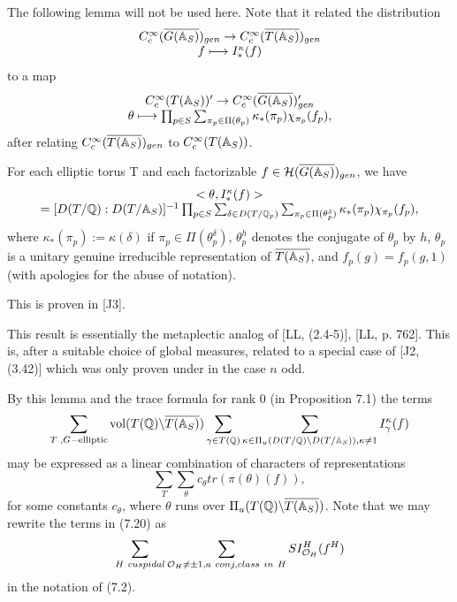 The following lemma will not be used here. Note that it related
the distribution
\[
\begin{array}{c}
C_c^\infty(\overline{G(\mathbb{A} _S)})_{gen}
\rightarrow
C_c^\infty(\overline{T(\mathbb{A} _S)})_{gen}\\
f\longmapsto I_*^\kappa(f)
\end{array}
\]
to a map
\[
\begin{array}{c}
C_c^\infty(T(\mathbb{A} _S))'
\rightarrow
C_c^\infty(\overline{G(\mathbb{A} _S)})'_{gen}\\
\theta \longmapsto
\prod_{p\in S}\sum_{\pi _p\in \Pi (\theta_p)}
\kappa _{*}(\pi _p)\chi _{\pi _p}(f_p),
\end{array}
\]
after relating $C_c^\infty(\overline{T(\mathbb{A} _S)})_{gen}$
to $C_c^\infty(T(\mathbb{A} _S))$.
\begin{lemma}
For each elliptic torus T and each factorizable
$f\in {\cal{H}}(\overline{G(\mathbb{A} _S)})_{gen}$, we have 
\[
\begin{array}{c}
<\theta ,I_{*}^\kappa (f )> \\ 
=[D(T/\mathbb{Q} ):D(T/\mathbb{A} _S)]^{-1}
\prod_{p\in S}
\sum_{\delta\in D(T/{\mathbb Q}_p)}
\sum_{\pi _p\in \Pi (\theta_p^\delta)}
\kappa _{*}(\pi _p)\chi _{\pi _p}(f_p),
\end{array}
\]
where $\kappa _{*}(\pi _p):=\kappa (\delta)$ if
$\pi _p\in \Pi (\theta_p^\delta)$,
${\theta }_p^h$ denotes the conjugate of ${\theta }_p$ by $h$,
${\theta }_p$ is a unitary genuine irreducible
representation of $\overline{T(\mathbb{A} _S)}$, and
$f_p(g)=f_p(g,1)$ (with apologies for the abuse of
notation).
\end{lemma}

This is proven in [J3].
\begin{remark}
This result is essentially the metaplectic analog of
[LL, (2.4-5)], [LL, p. 762]. This is, after a suitable 
choice of global measures, related to a special case of
[J2, (3.42)] which was only proven under in the case $n$ odd.
\end{remark}

By this lemma and the trace formula for rank 0 (in
Proposition 7.1)
the terms 
\begin{equation}
\sum_{ T \; , G-\mathrm{elliptic} }
{\rm vol}(T(\mathbb{Q} )\backslash \overline{T(\mathbb{A} _S)})
\sum_{\gamma \in T(\mathbb{Q} )}
\sum_{ \kappa \in \Pi _u(D(T/{\mathbb Q})\backslash D(T/\mathbb{A} _S)),
 \kappa \neq 1}
I_\gamma ^\kappa (f)
\end{equation}
may be expressed as a linear combination of characters of representations 
\begin{equation}
\sum_T
\sum_\theta c_\theta tr(\pi (\theta )(f)),
\end{equation}
for some constants $c_\theta$, where $\theta$ runs over
$\Pi_u(T(\mathbb{Q} )\backslash \overline{T(\mathbb{A} _S)})$.
Note that we may rewrite the terms in (7.20) as
\[
\sum_{H\ cuspidal}
\sum_{ {\cal O}_H\not= \pm 1,
a\ conj,
class\ in\ H}
SI_{{\cal O}_H}^H(f^H)
\]
in the notation of (7.2).

